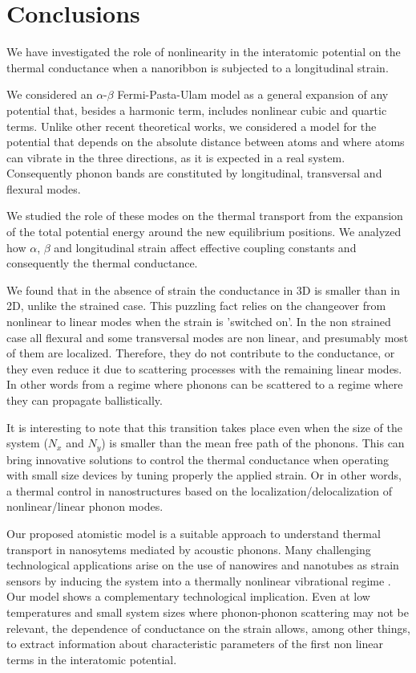 \documentclass[12pt]{article}
\begin{document}
									
									
\section{Conclusions}

We have investigated the role of nonlinearity in the interatomic potential on the thermal conductance when a nanoribbon is subjected to a longitudinal strain.

We considered an $\alpha$-$\beta$ Fermi-Pasta-Ulam model as a general expansion of any potential that, besides a harmonic term, includes nonlinear cubic and quartic terms. Unlike other recent theoretical works, we considered a model for the potential that depends on the absolute distance between atoms and where atoms can vibrate in the three directions, as it is expected in a real system. Consequently phonon bands are constituted by longitudinal, transversal and flexural modes.

We studied the role of these modes on the thermal transport from the expansion of the total potential energy around the new equilibrium positions. We analyzed how $\alpha$, $\beta$ and longitudinal strain affect effective coupling constants and consequently the thermal conductance.

We found that in the absence of strain the conductance in 3D is smaller than in 2D, unlike the strained case. This puzzling fact relies on the changeover from nonlinear to linear modes when the strain is 'switched on'. In the non strained case all flexural and some transversal modes are non linear, and presumably most of them are localized. Therefore, they do not contribute to the conductance, or they even reduce it due to scattering processes with the remaining linear modes. In other words from a regime where phonons can be scattered to a regime where they can propagate ballistically.

It is interesting to note that this transition takes place even when the size of the system ($N_x$ and $N_y$) is smaller than the mean free path of the phonons.  This can bring innovative solutions to control the thermal conductance when operating with small size devices by tuning properly the applied strain. Or in other words, a thermal control in nanostructures based on the localization/delocalization of nonlinear/linear phonon modes.

Our proposed atomistic model is a suitable approach to understand thermal transport in nanosytems mediated by acoustic phonons. Many challenging technological applications arise on the use of nanowires and nanotubes as strain sensors by inducing the system into a thermally nonlinear vibrational regime \cite{nuestroJSM, nanosensor}. Our model shows a complementary technological implication. Even at low temperatures and small system sizes where phonon-phonon scattering may not be relevant, the dependence of conductance on the strain allows, among other things, to extract information about characteristic parameters of the first non linear terms in the interatomic potential. 
\end{document}
